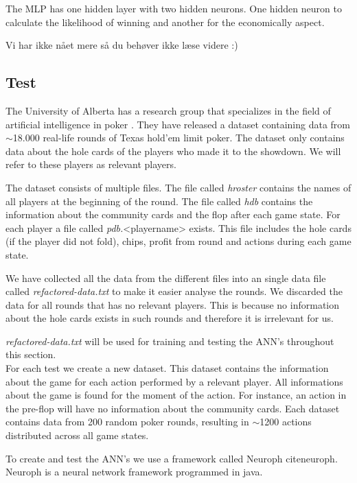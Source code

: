 The MLP has one hidden layer with two hidden neurons. One hidden neuron to calculate the likelihood of winning and another for the economically aspect.



Vi har ikke nået mere så du behøver ikke læse videre :)

\subsection{Test}
\label{sec:default-test}

The University of Alberta has a research group that specializes in the field of artificial intelligence in poker \cite{alberta}. They have released a dataset containing data from $\sim$18.000 real-life rounds of Texas hold'em limit poker. The dataset only contains data about the hole cards of the players who made it to the showdown. We will refer to these players as relevant players.

The dataset consists of multiple files. The file called \textit{hroster} contains the names of all players at the beginning of the round. The file called \textit{hdb} contains the information about the community cards and the flop after each game state. For each player a file called \textit{pdb.}<playername> exists. This file includes the hole cards (if the player did not fold), chips, profit from round and actions during each game state. 

We have collected all the data from the different files into an single data file called \textit{refactored-data.txt} to make it easier analyse the rounds. We discarded the data for all rounds that has no relevant players. This is because no information about the hole cards exists in such rounds and therefore it is irrelevant for us. 

\textit{refactored-data.txt} will be used for training and testing the ANN's throughout this section.\\

For each test we create a new dataset. This dataset contains the information about the game for each action performed by a relevant player. All informations about the game is found for the moment of the action. For instance, an action in the pre-flop will have no information about the community cards.
Each dataset contains data from 200 random poker rounds, resulting in $\sim$1200 actions distributed across all game states.

To create and test the ANN's we use a framework called Neuroph cite{neuroph}. Neuroph is a neural network framework programmed in java. 

